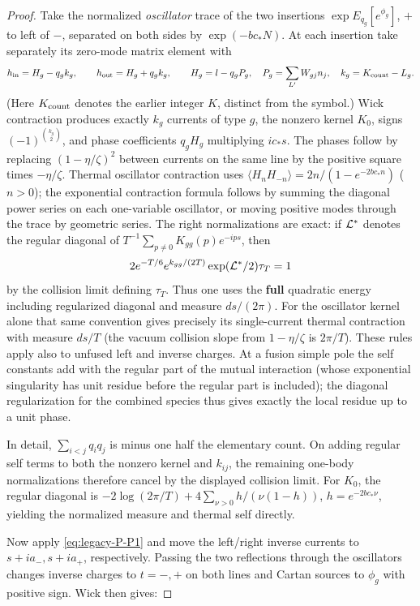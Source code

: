\begin{proof}
Take the normalized \emph{oscillator} trace of the two insertions \(\exp E_{q_g}[e^{\phi_g}]\), \(+\) to left of \(-\), separated on both sides by \(\exp(-bc_* N)\). At each insertion take separately its zero-mode matrix element with
\[
 h_{\rm in}=H_g-q_g k_g,\qquad h_{\rm out}=H_g+q_g k_g,\qquad
 H_g=l-q_g P_g,\quad P_g=\sum_{L'}W_{g j}n_j,\quad k_g=K_{\rm count}-L_g .
\]
(Here \(K_{\rm count}\) denotes the earlier integer \(K\), distinct from the symbol.) Wick contraction produces exactly \(k_g\) currents of type \(g\), the nonzero kernel \(K_0\), signs \((-1)^{\binom{k_g}2}\), and phase coefficients \(q_g H_g\) multiplying \(i c_*s\). The phases follow by replacing \((1-\eta/\zeta)^2\) between currents on the same line by the positive square times \(-\eta/\zeta\). Thermal oscillator contraction uses \(\langle H_n H_{-n}\rangle=2n/(1-e^{-2bc_*n})\) (\(n>0\)); the exponential contraction formula follows by summing the diagonal power series on each one-variable oscillator, or moving positive modes through the trace by geometric series. The right normalizations are exact: if \({\cal L}^*\) denotes the regular diagonal of \(T^{-1}\sum_{p\ne0}K_{gg}(p)e^{-ips}\), then
\[
 2e^{-T/6} e^{k_{gg}/(2T)}\exp({\cal L}^*/2)\tau_T=1
\]
by the collision limit defining \(\tau_T\). Thus one uses the \textbf{full} quadratic energy including regularized diagonal and measure \(ds/(2\pi)\). For the oscillator kernel alone that same convention gives precisely its single-current thermal contraction with measure \(ds/T\) (the vacuum collision slope from \(1-\eta/\zeta\) is \(2\pi/T\)). These rules apply also to unfused left and inverse charges. At a fusion simple pole the self constants add with the regular part of the mutual interaction (whose exponential singularity has unit residue before the regular part is included); the diagonal regularization for the combined species thus gives exactly the local residue up to a unit phase.

In detail, \(\sum_{i<j}q_iq_j\) is minus one half the elementary count. On adding regular self terms to both the nonzero kernel and \(k_{ij}\), the remaining one-body normalizations therefore cancel by the displayed collision limit. For \(K_0\), the regular diagonal is \(-2\log(2\pi/T)+4\sum_{\nu>0} h/(\nu(1-h))\), \(h=e^{-2bc_*\nu}\), yielding the normalized measure and thermal self directly.

Now apply \eqref{eq:legacy-P-P1} and move the left/right inverse currents to \(s+ia_-,s+ia_+\), respectively. Passing the two reflections through the oscillators changes inverse charges to \(t=-,+\) on both lines and Cartan sources to \(\phi_g\) with positive sign. Wick then gives:


\end{proof}
